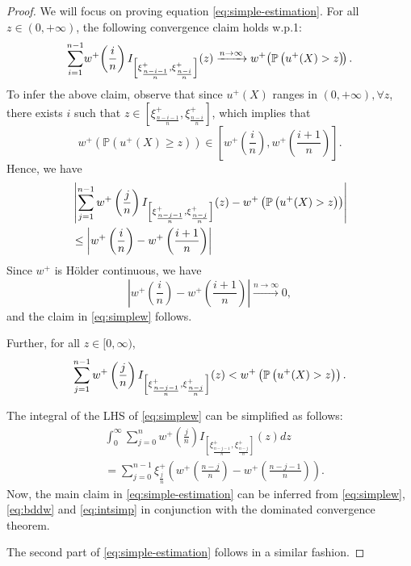 \begin{proof}
We will focus on proving equation \eqref{eq:simple-estimation}. 
For all $z \in (0,+\infty)$, the following convergence claim holds w.p.1:  %
\begin{align}
\sum_{i=1}^{n-1}\! w^+\! \left(\frac{i}{n}\right) 
I_{\left[\xi^+_\frac{n-i-1}{n}, \xi^+_\frac{n-i}{n}\right]}(z) \xrightarrow{n \rightarrow\infty} w^+\!\left(\mathbb{P}\left( u^{+}(X)>z \right)\!\right).
\label{eq:simplew}
\end{align}
To infer the above claim, observe that since $u^+(X)$  
ranges in $(0,+\infty), \forall z$, there exists $i$ such that 
$z \in [\xi^+_{\frac{n-i-1}{n}}, \xi^+_{\frac{n-i}{n}}]$, which implies that 
$$w^+ \left( \mathbb{P} \left( u^+\left( X \right) \geq z \right)\right) \in \left[w^+\left(\frac{i}{n} \right), w^+\left( \frac{i+1}{n} \right)\right]. $$
Hence, we have 
\begin{align}
&\left| \sum_{j=1}^{n-1} w^+ \left(\frac{j}{n}\right) 
I_{\left[\xi^+_\frac{n-j-1}{n}, \xi^+_\frac{n-j}{n}\right]}(z) - w^+\left(\mathbb{P}\left( u^{+}(X)>z \right)\right)\right| \nonumber \\
&\leq  \left| w^+\left(\frac{i}{n} \right) - w^+\left( \frac{i+1}{n} \right) \right| \nonumber
\end{align}
Since $w^+$ is H\"{o}lder continuous, we have 
$$ \left | w^+\left(\frac{i}{n}\right)- w^+\left(\frac{i+1}{n}\right)\right| \xrightarrow{n \rightarrow \infty} 0,$$
and  the claim in \eqref{eq:simplew} follows.

Further, for all $z \in [0,\infty)$,
\begin{align}
\sum_{j=1}^{n-1} w^+ \left(\frac{j}{n}\right) 
I_{\left[\xi^+_\frac{n-j-1}{n}, \xi^+_\frac{n-j}{n}\right]}(z)
<
w^+\left(\mathbb{P}\left( u^{+}(X)>z \right)\right).\label{eq:bddw}
\end{align}

The integral of the LHS of \eqref{eq:simplew} can be simplified as follows:
\begin{align}
& \int_0^{\infty} \sum_{j=0}^{n} w^+ \left(\frac{j}{n}\right) 
 I_{\left[\xi^+_\frac{n-j-1}{n}, \xi^+_\frac{n-j}{n}\right]}(z) dz \nonumber\\
& = \sum_{j=0}^{n-1} \xi^+_{\frac{j}{n}} \left(w^+\left(\frac{n-j}{n}\right)-
    w^+\left(\frac{n-j-1}{n}\right)\right).\label{eq:intsimp}
\end{align}
Now, the main claim in \eqref{eq:simple-estimation} can be inferred from \eqref{eq:simplew},\eqref{eq:bddw} and \eqref{eq:intsimp} in conjunction with the dominated convergence theorem.

The second part of \eqref{eq:simple-estimation} follows in a similar fashion.
\end{proof} 


